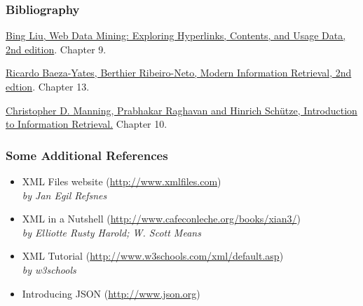 \documentclass[svgnames]{beamer}
\subtitle{Semi-Structured Data : JSON , XML and XPath}
\begin{document}
\maketitle

\begin{frame} \frametitle{Bibliography}

   \begin{block}{}
        \href{http://www.cs.uic.edu/~liub/WebMiningBook.html}{Bing Liu, Web Data Mining: Exploring Hyperlinks, Contents, and
         Usage Data, 2nd edition}. Chapter 9.
    \end{block}

   \begin{block}{}

    \href{http://www.mir2ed.org/}{Ricardo Baeza-Yates,
            Berthier Ribeiro-Neto, Modern Information Retrieval, 2nd
            edtion}. Chapter 13.

    \end{block}

   \begin{block}{}

    \href{http://nlp.stanford.edu/IR-book/}{Christopher D. Manning, Prabhakar Raghavan and Hinrich Schütze, Introduction to Information Retrieval.} Chapter 10.

    \end{block}
    
\end{frame}

\begin{frame}
\frametitle{Some Additional References}

\begin{itemize}
 \item XML Files website {\scriptsize (\url{http://www.xmlfiles.com})} \\
 {\it by Jan Egil Refsnes}
 \item XML in a  Nutshell {\scriptsize (\url{http://www.cafeconleche.org/books/xian3/})} \\
 {\it by Elliotte Rusty Harold; W. Scott Means}
 \item XML Tutorial {\scriptsize (\url{http://www.w3schools.com/xml/default.asp})} \\
 {\it by w3schools}
 \item Introducing JSON {\scriptsize (\url{http://www.json.org})} 
\end{itemize}

\end{frame}
\end{document}
